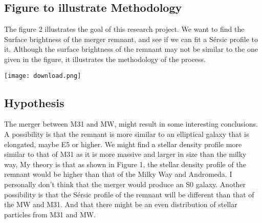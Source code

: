 \documentclass[linenumbers, preprint, times]{aastex631}
\begin{document}
\subsection{Figure to illustrate Methodology}
\par
The figure 2 illustrates the goal of this research project. We want to find the Surface brightness of the merger remnant, and see if we can fit a Sérsic profile to it. Although the surface brightness of the remnant may not be similar to the one given in the figure, it illustrates the methodology of the process.
\begin{center}
\texttt{[image: download.png]}%
\label{labelname}%
\end{center}
\par
\subsection{Hypothesis}
The merger between M31 and MW, might result in some interesting conclusions. A possibility is that the remnant is more similar to an elliptical galaxy that is elongated, maybe E5 or higher. We might find a stellar density profile more similar to that of M31 as it is more massive and larger in size than the milky way, My theory is that as shown in Figure 1, the stellar density profile of the remnant would be higher than that of the Milky Way and Andromeda. I personally don't think that the merger would produce an S0 galaxy. Another possibility is that the Sérsic profile of the remnant will be different than that of the MW and M31. And that there might be an even distribution of stellar particles from M31 and MW.

\nolinenumbers
{}

\end{document}
